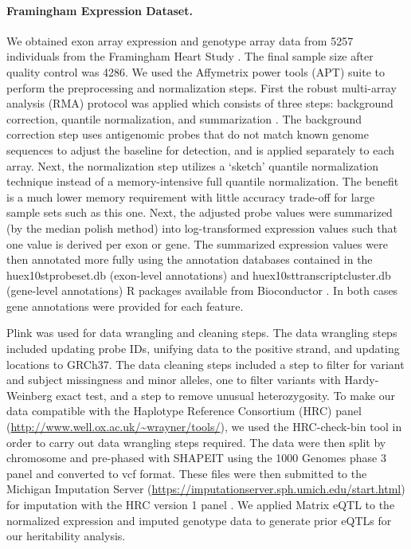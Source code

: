 \documentclass[10pt,letterpaper]{article}
\begin{document}
\paragraph*{Framingham Expression Dataset.}\label{framingham-dataset}

We obtained exon array expression and genotype array data from 5257 individuals from the Framingham Heart Study \cite{Zhang_2015}. The final sample size after quality control was 4286. We used the Affymetrix power tools (APT) suite to perform the preprocessing and normalization steps. First the robust multi-array analysis (RMA) protocol was applied which consists of three steps: background correction, quantile normalization, and summarization \cite{irizarry2003summaries}. The background correction step uses antigenomic probes that do not match known genome sequences to adjust the baseline for detection, and is applied separately to each array. Next, the normalization step utilizes a `sketch' quantile normalization technique instead of a memory-intensive full quantile normalization. The benefit is a much lower memory requirement with little accuracy trade-off for large sample sets such as this one. Next, the adjusted probe values were summarized (by the median polish method) into log-transformed expression values such that one value is derived per exon or gene. The summarized expression values were then annotated more fully using the annotation databases contained in the huex10stprobeset.db (exon-level annotations) and huex10sttranscriptcluster.db (gene-level annotations) R packages available from Bioconductor \cite{MacDonald_1,MacDonald_2}. In both cases gene annotations were provided for each feature. 

Plink \cite{chang2015second} was used for data wrangling and cleaning steps. The data wrangling steps included updating probe IDs, unifying data to the positive strand, and updating locations to GRCh37. The data cleaning steps included a step to filter for variant and subject missingness and minor alleles, one to filter variants with Hardy-Weinberg exact test, and a step to remove unusual heterozygosity. To make our data compatible with the Haplotype Reference Consortium (HRC) panel (\url{http://www.well.ox.ac.uk/~wrayner/tools/}), we used the HRC-check-bin tool in order to carry out data wrangling steps required. The data were then split by chromosome and pre-phased with SHAPEIT \cite{delaneau2012linear} using the 1000 Genomes phase 3 panel and converted to vcf format. These files were then submitted to the Michigan Imputation Server (\url{https://imputationserver.sph.umich.edu/start.html}) \cite{Howie_2012,Fuchsberger_2014} for imputation with the HRC version 1 panel \cite{mccarthy2015reference}.  We applied Matrix eQTL \cite{shabalin2012matrix} to the normalized expression and imputed genotype data to generate prior eQTLs for our heritability analysis.
\end{document}
